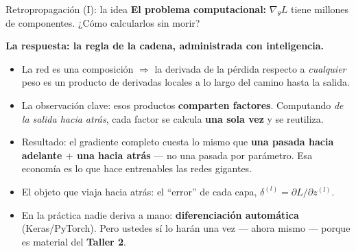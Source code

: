\documentclass{beamer}
\newcommand{\1}{\mathbb{I}}
\begin{document}
\begin{frame}{Retropropagación (I): la idea}
\small
\textbf{El problema computacional:} $\nabla_\theta L$ tiene millones de componentes. ¿Cómo calcularlos sin morir?
\pause

\vspace{0.2cm}
\textbf{La respuesta: la regla de la cadena, administrada con inteligencia.}
\begin{itemize}\itemsep5pt
  \item La red es una composición $\Rightarrow$ la derivada de la pérdida respecto a \emph{cualquier} peso es un producto de derivadas locales a lo largo del camino hasta la salida.
  \item La observación clave: esos productos \textbf{comparten factores}. Computando \emph{de la salida hacia atrás}, cada factor se calcula \textbf{una sola vez} y se reutiliza. \pause
  \item Resultado: el gradiente completo cuesta lo mismo que \textbf{una pasada hacia adelante $+$ una hacia atrás} --- no una pasada por parámetro. Esa economía es lo que hace entrenables las redes gigantes.
\end{itemize}
\pause

\vspace{0.15cm}
\begin{itemize}\itemsep3pt
  \item El objeto que viaja hacia atrás: el ``error'' de cada capa, $\delta^{(l)} = \partial L / \partial z^{(l)}$.
  \item En la práctica nadie deriva a mano: \textbf{diferenciación automática} (Keras/PyTorch). Pero ustedes sí lo harán una vez --- ahora mismo --- porque es material del \textbf{Taller 2}.
\end{itemize}
\end{frame}
\end{document}
